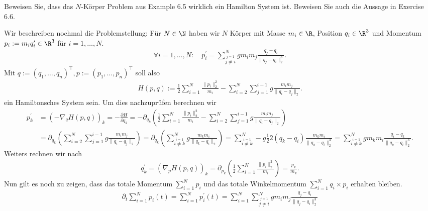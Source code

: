 \begin{exercise}
  Beweisen Sie, dass das $N$-Körper Problem aus Example 6.5
  wirklich ein Hamilton System ist. Beweisen Sie auch die
  Aussage in Exercise 6.6.
\end{exercise}

\begin{solution}
  Wir beschreiben nochmal die Problemstellung: Für $N \in \N$ haben wir $N$ Körper
  mit Masse $m_i \in \R$, Position $q_i \in \R^3$ und Momentum $p_i := m_iq_i^{\prime} \in \R^3$
  für $i = 1,\dots,N$.
  \begin{align*}
    \forall i = 1,\dots,N: \quad p_i^{\prime} = \sum_{\stackrel{j = 1}{j \neq i}}^N gm_im_j \frac{q_j - q_i}{\|q_j - q_i\|_2^3}.
  \end{align*}
  Mit $q := (q_1,\dots,q_n)^{\top}, p := (p_1,\dots,p_n)^{\top}$ soll also
  \begin{align*}
    H(p,q) := \frac{1}{2}\sum_{i=1}^N \frac{\|p_i\|_2^2}{m_i}- \sum_{i = 2}^N\sum_{j=1}^{i-1}g\frac{m_im_j}{\|q_i-q_j\|_2}.
  \end{align*}
  ein Hamiltonsches System sein. Um dies nachzuprüfen berechnen wir
  \begin{align*}
    p_k^{\prime} &= \left(- \nabla_q H(p,q)\right)_k = - \frac{\partial H}{\partial q_k}
    = -\partial_{q_k}\left(\frac{1}{2}\sum_{i=1}^N \frac{\|p_i\|_2^2}{m_i}- \sum_{i = 2}^N\sum_{j=1}^{i-1}g\frac{m_im_j}{\|q_i-q_j\|_2}\right) \\
    &= \partial_{q_k}\left(\sum_{i = 2}^N\sum_{j=1}^{i-1}g\frac{m_im_j}{\|q_i-q_j\|_2}\right)
    = \partial_{q_k}\left(\sum_{\stackrel{i = 1}{i \neq k}}^{N}g\frac{m_km_i}{\|q_k-q_i\|_2}\right)
    = \sum_{\stackrel{i = 1}{i \neq k}}^{N}-g\frac{1}{2}2(q_k - q_i)\frac{m_km_i}{\|q_k-q_i\|_2^3}
    = \sum_{\stackrel{i = 1}{i \neq k}}^{N}gm_km_i\frac{q_i - q_k}{\|q_k-q_i\|_2^3}.
  \end{align*}
  Weiters rechnen wir nach
  \begin{align*}
    q_k^{\prime} = \left(\nabla_p H(p,q)\right)_k = \partial_{p_k}\left(\frac{1}{2}\sum_{i=1}^N \frac{\|p_i\|_2^2}{m_i}\right)
    = \frac{p_k}{m_k}.
  \end{align*}
  Nun gilt es noch zu zeigen, dass das totale Momentum $\sum_{i=1}^N p_i$
  und das totale Winkelmomentum $\sum_{i=1}^N q_i \times p_i$ erhalten bleiben.
  \begin{align*}
    \partial_t \sum_{i=1}^N p_i(t) = \sum_{i=1}^N p_i^{\prime}(t)
    = \sum_{i=1}^N \sum_{\stackrel{j = 1}{j \neq i}}^N gm_im_j \frac{q_j - q_i}{\|q_j - q_i\|_2^3}

\end{align*}
\end{solution}
